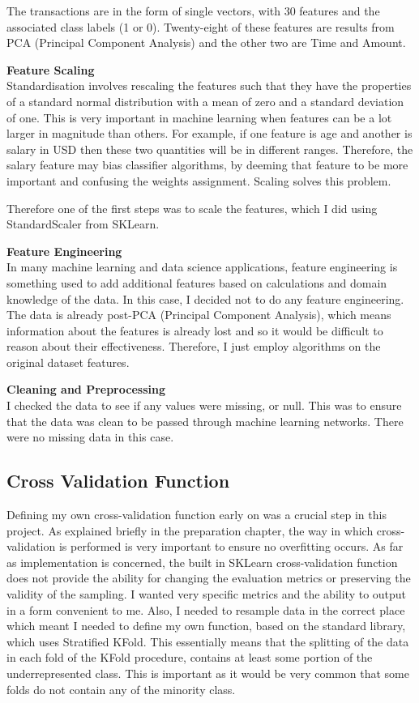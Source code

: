 \documentclass[12pt,a4paper,twoside]{report}
\begin{document}
The transactions are in the form of single vectors, with 30 features and the associated class labels (1 or 0). Twenty-eight of these features are results from PCA (Principal Component Analysis) and the other two are Time and Amount. 

\textbf{Feature Scaling}\\

Standardisation involves rescaling the features such that they have the properties of a standard normal distribution with a mean of zero and a standard deviation of one. This is very important in machine learning when features can be a lot larger in magnitude than others. For example, if one feature is age and another is salary in USD then these two quantities will be in different ranges. Therefore, the salary feature may bias classifier algorithms, by deeming that feature to be more important and confusing the weights assignment. Scaling solves this problem. 

Therefore one of the first steps was to scale the features, which I did using StandardScaler from SKLearn. 

\textbf{Feature Engineering}\\

In many machine learning and data science applications, feature engineering is something used to add additional features based on calculations and domain knowledge of the data. In this case, I decided not to do any feature engineering. The data is already post-PCA (Principal Component Analysis), which means information about the features is already lost and so it would be difficult to reason about their effectiveness. Therefore, I just employ algorithms on the original dataset features.

\textbf{Cleaning and Preprocessing}\\

I checked the data to see if any values were missing, or null. This was to ensure that the data was clean to be passed through machine learning networks. There were no missing data in this case.

\subsection{Cross Validation Function}

Defining my own cross-validation function early on was a crucial step in this project. As explained briefly in the preparation chapter, the way in which cross-validation is performed is very important to ensure no overfitting occurs. As far as implementation is concerned, the built in SKLearn cross-validation function does not provide the ability for changing the evaluation metrics or preserving the validity of the sampling. I wanted very specific metrics and the ability to output in a form convenient to me. Also, I needed to resample data in the correct place which meant I needed to define my own function, based on the standard library, which uses Stratified KFold. This essentially means that the splitting of the data in each fold of the KFold procedure, contains at least some portion of the underrepresented class. This is important as it would be very common that some folds do not contain any of the minority class. 
\end{document}
